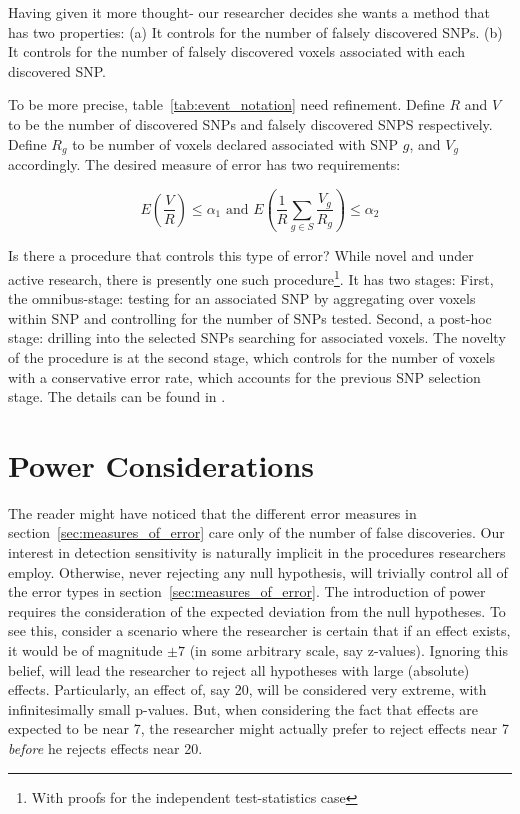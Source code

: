 \documentclass[review,12pt]{article}
\begin{document}
Having given it more thought- our researcher decides she wants a method that has two properties: 
(a) It controls for the number of falsely discovered SNPs. 
(b) It controls for the number of falsely discovered voxels associated with each discovered SNP. 

To be more precise, table~\ref{tab:event_notation} need refinement. Define $R$ and $V$ to be the number of discovered SNPs and falsely discovered SNPS respectively. 
Define $R_g$ to be number of voxels declared associated with SNP $g$, and $V_g$ accordingly. The desired measure of error has two requirements: 

\begin{equation} \label{eq:hirarchial_error}
 E \left(\frac{V}{R} \right)\leq \alpha_1 
\text{ and } 
E \left( \frac{1}{R}\sum_{g \in S} \frac{V_{g}}{R_{g}} \right)\leq \alpha_2
\end{equation}



Is there a procedure that controls this type of error? While novel and under active research, there is presently one such procedure\footnote{With proofs for the independent test-statistics case}. It has two stages: 
First, the omnibus-stage:  testing for an associated SNP by aggregating over voxels within SNP and controlling for the number of SNPs tested. Second, a post-hoc stage: drilling into the selected SNPs searching for associated voxels. The novelty of the procedure is at the second stage, which controls for the number of voxels with a conservative error rate, which accounts for the previous SNP selection stage. 
The details can be found in \citet{benjamini_adjusting_2011}.




\section{\label{sec:power}Power Considerations}

The reader might have noticed that the different error measures in section~\ref{sec:measures_of_error} care only of the number of false discoveries. Our interest in detection sensitivity is naturally implicit in the procedures researchers employ. Otherwise, never rejecting any null hypothesis, will trivially control all of the error types in section~\ref{sec:measures_of_error}. 
The introduction of power requires the consideration of the expected deviation from the null hypotheses. To see this, consider a scenario where the researcher is certain that if an effect exists, it would be of magnitude $\pm 7$ (in some arbitrary scale, say z-values). Ignoring this belief, will lead the researcher to reject all hypotheses with large (absolute) effects. Particularly, an effect of, say 20,  will be considered very extreme, with infinitesimally small p-values. But, when considering the fact that effects are expected to be near 7, the researcher might actually prefer to reject effects near 7 \emph{before} he rejects effects near 20. 
\end{document}
